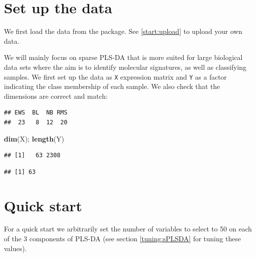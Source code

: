 \documentclass[]{book}
\newenvironment{Shaded}{\begin{snugshade}}{\end{snugshade}}
\newcommand{\KeywordTok}[1]{\textcolor[rgb]{0.13,0.29,0.53}{\textbf{#1}}}
\newcommand{\StringTok}[1]{\textcolor[rgb]{0.31,0.60,0.02}{#1}}
\newcommand{\OperatorTok}[1]{\textcolor[rgb]{0.81,0.36,0.00}{\textbf{#1}}}
\newcommand{\NormalTok}[1]{#1}
\theoremstyle{definition}
\theoremstyle{definition}
\theoremstyle{definition}
\theoremstyle{remark}
\begin{document}
\section{Set up the data}\label{set-up-the-data}

We first load the data from the package. See \ref{start:upload} to
upload your own data.

We will mainly focus on sparse PLS-DA that is more suited for large
biological data sets where the aim is to identify molecular signatures,
as well as classifying samples. We first set up the data as \texttt{X}
expression matrix and \texttt{Y} as a factor indicating the class
membership of each sample. We also check that the dimensions are correct
and match:

\begin{Shaded}
\end{Shaded}

\begin{verbatim}
## EWS  BL  NB RMS 
##  23   8  12  20
\end{verbatim}

\begin{Shaded}
\begin{Highlighting}[]
\KeywordTok{dim}\NormalTok{(X); }\KeywordTok{length}\NormalTok{(Y)}
\end{Highlighting}
\end{Shaded}

\begin{verbatim}
## [1]   63 2308
\end{verbatim}

\begin{verbatim}
## [1] 63
\end{verbatim}

\section{Quick start}\label{quick-start-1}

For a quick start we arbitrarily set the number of variables to select
to 50 on each of the 3 components of PLS-DA (see section
\ref{tuning:sPLSDA} for tuning these values).
\end{document}
